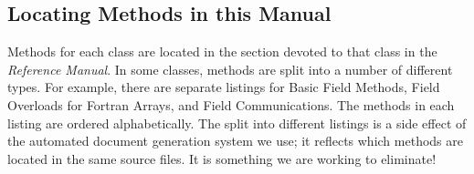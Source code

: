 \subsection{Locating Methods in this Manual}

Methods for each class are located in the section devoted to 
that class in the {\it Reference Manual}.  In some classes, methods
are split into a number of different types.  For example, there are 
separate listings for Basic Field Methods, Field Overloads for Fortran Arrays,
and Field Communications.  The methods in each listing are ordered 
alphabetically.  The split into different listings is a side effect
of the automated document generation system we use; it reflects 
which methods are located in the same source files.  It is something 
we are working to eliminate!   


